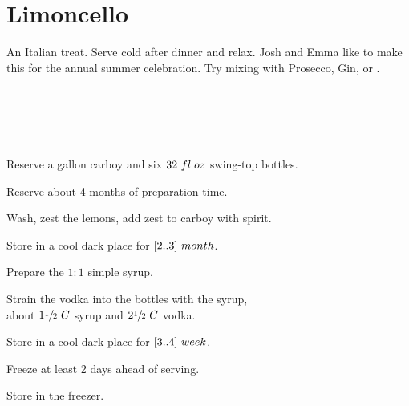 \section[Limoncello]{Limoncello~}

\begin{recipestats}[
        servings=1\onehalf~\gallon,
        preptime=1~\hour,
        inactivetime=4~\Month,
        source=Emma \& Josh,
    ]
\end{recipestats}

\begin{recipeabstract}
    An Italian treat.
    Serve cold after dinner and relax.
    Josh and Emma like to make this for the annual summer celebration.
    Try mixing with Prosecco, Gin, or .
\end{recipeabstract}

\begin{ingredientcolumns}
    \begin{ingredientblock}[tincture]
        \\
    \end{ingredientblock}

    \medskip
    \begin{ingredientblock}[syrup]
        \\
        \\
    \end{ingredientblock}
\end{ingredientcolumns}

\begin{preparation}

\item Reserve a gallon carboy and six $32~fl\;oz$ swing-top bottles.

\item Reserve about 4 months of preparation time.

\item Wash, zest the lemons, add zest to carboy with spirit.

\item Store in a cool dark place for $[2..3]~month$.

\item Prepare the $1:1$ simple syrup.

\item Strain the vodka into the bottles with the syrup,\\
    about $1\sfrac{1}{2}~C$ syrup and $2\sfrac{1}{2}~C$ vodka.

\item Store in a cool dark place for $[3..4]~week$.

\item Freeze at least 2 days ahead of serving.

\item Store in the freezer.

\end{preparation}

\recipeend%
